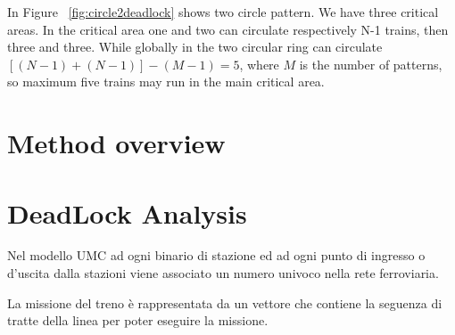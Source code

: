 \documentclass{ewic}
\begin{document}

In Figure ~\ref{fig:circle2deadlock} shows two circle pattern. We have three critical areas. In the critical area one and two can circulate respectively N-1 trains, then three and three. While globally in the two circular ring can circulate $[(N-1) + (N-1)] - (M-1)=5$, where $M$ is the number of patterns, so maximum five trains may run in the main critical area.

\section{Method overview}


\section{DeadLock Analysis}

Nel modello UMC ad ogni binario di stazione ed ad ogni punto di ingresso o d'uscita dalla stazioni viene associato un numero univoco nella rete ferroviaria.

La missione del treno è rappresentata da un vettore che contiene la seguenza di tratte della linea per poter eseguire la missione.

\makeatletter
\newbox\sf@box
\newenvironment{SubFloat}[2][]%
{\def\sf@one{#1}%
\def\sf@two{#2}%
\setbox\sf@box\hbox
\bgroup}%
{ \egroup
\ifx\@empty\sf@two\@empty\relax
\def\sf@two{\@empty}
\fi
\ifx\@empty\sf@one\@empty\relax
\subfloat[\sf@two]{\box\sf@box}%
\else
\subfloat[\sf@one][\sf@two]{\box\sf@box}%
\fi}
\makeatother
\end{document}
